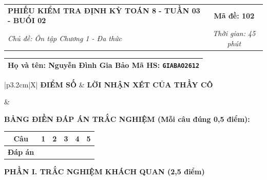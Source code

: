 \documentclass[12pt,a4paper]{article}
\begin{document}
\newpage


\noindent
\begin{tabularx}{\linewidth}{|X|c|}
\hline
\textbf{PHIẾU KIỂM TRA ĐỊNH KỲ TOÁN 8 - TUẦN 03 - BUỔI 02} & \textbf{Mã đề: 102} \\
\textit{Chủ đề: Ôn tập Chương 1 - Đa thức} & \textit{Thời gian: 45 phút} \\
\hline
\end{tabularx}

\vspace{1mm}

\noindent
\begin{tabularx}{\linewidth}{|X|}
\hline
\rule[-2mm]{0pt}{7.5mm}\textbf{Họ và tên:} \textbf{\large Nguyễn Đình Gia Bảo} \hfill \textbf{Mã HS:} \texttt{GIABAO2612} \quad \\
\hline
\end{tabularx}

\vspace{1mm}

\noindent
\begin{tabularx}{\linewidth}{|p{3.2cm}|X|}
\hline
\centering\textbf{ĐIỂM SỐ} & \centering\textbf{LỜI NHẬN XÉT CỦA THẦY CÔ} \tabularnewline
\hline
\rule{0pt}{1.3cm} & \tabularnewline
\hline
\end{tabularx}

\vspace{1.2mm}

\noindent\textbf{BẢNG ĐIỀN ĐÁP ÁN TRẮC NGHIỆM (Mỗi câu đúng 0,5 điểm):}
\vspace{0.8mm}

\noindent
\renewcommand{\arraystretch}{1.35}
\begin{tabularx}{\linewidth}{|c|*{5}{>{\centering\arraybackslash}X|}}
\hline
\textbf{Câu} & \textbf{1} & \textbf{2} & \textbf{3} & \textbf{4} & \textbf{5} \\
\hline
\textbf{Đáp án} & & & & & \\
\hline
\end{tabularx}
\renewcommand{\arraystretch}{1.0}

\vspace{1.5mm}

\noindent\textbf{\large PHẦN I. TRẮC NGHIỆM KHÁCH QUAN (2,5 điểm)}
\vspace{1mm}
\end{document}

